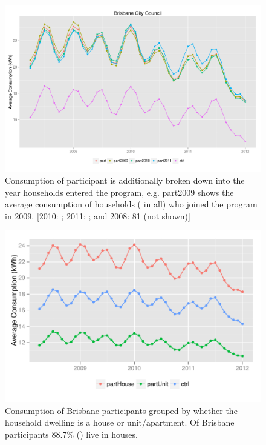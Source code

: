 \documentclass[a4paper,11pt]{article}
\begin{document}
\begin{figure}
\begin{center}
\includegraphics[width=1\textwidth]{figures/BrisbaneConsump.pdf}
\caption{Consumption of participant is additionally broken down into the
year households entered the program, e.g. part2009 shows the average
consumption of households ( in all) who joined the program
in 2009. [2010: ; 2011: ; and 2008: 81
(not shown)]}
\end{center}
\end{figure}

\begin{figure}
\begin{center}
\includegraphics[width=1\textwidth]{figures/BrisHouseUnit.pdf}
\caption{Consumption of Brisbane participants grouped by whether the
household dwelling is a house or unit/apartment. Of 
Brisbane participants 88.7\% () live in houses.}
\end{center}
\end{figure}
\end{document}
